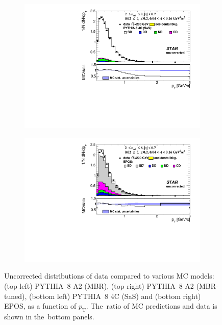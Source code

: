 \begin{figure}[t!]
\begin{subfigure}{.49\textwidth}
		\includegraphics[width=\linewidth, page=1]{chapters/chrgSTAR/img/nonSD/SDT_pythia_xi0_sas_RP_starsim_pt.pdf}
	\end{subfigure}
	\begin{subfigure}{.49\textwidth}
		\includegraphics[width=\linewidth, page=1]{chapters/chrgSTAR/img/nonSD/chrg/SDT_epos_xi0_RP_starsim_pt.pdf}
	\end{subfigure}
		\caption{Uncorrected distributions of data compared to various MC models: (top left) PYTHIA~8 A2 (MBR), (top right) PYTHIA~8 A2 (MBR-tuned), (bottom left) PYTHIA~8 4C (SaS) and (bottom right) EPOS, as a function of $p_{\mathrm{T}}$. The~ratio of MC predictions and data is shown in the~bottom panels.}
		\label{fig:nonSDpt}
\end{figure}
